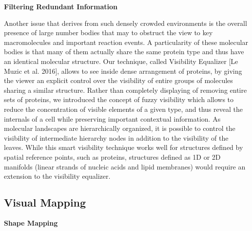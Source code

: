 \textbf{Filtering Redundant Information}

Another issue that derives from such densely crowded environments is the overall presence of large number bodies that may to obstruct the view to key macromolecules and important reaction events. 
A particularity of these molecular bodies is that many of them actually share the same protein type and thus have an identical molecular structure.
Our technique, called Visibility Equalizer [Le Muzic et al. 2016], allows to see inside dense arrangement of proteins, by giving the viewer an explicit control over the visibility of entire groups of molecules sharing a similar structure. 
Rather than completely displaying of removing entire sets of proteins, we introduced the concept of fuzzy visibility which allows to reduce the concentration of visible elements of a given type, and thus reveal the internals of a cell while preserving important contextual information.
As molecular landscapes are hierarchically organized, it is possible to control the visibility of intermediate hierarchy nodes in addition to the visibility of the leaves. 
While this smart visibility technique works well for structures defined by spatial reference points, such as proteins, structures defined as 1D or 2D manifolds (linear strands of nucleic acids and lipid membranes) would require an extension to the visibility equalizer.

\subsection{Visual Mapping}


\textbf{Shape Mapping}

